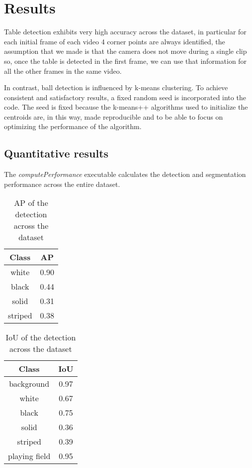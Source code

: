 \section{Results}
Table detection exhibits very high accuracy across the dataset, in particular for each initial frame of each video 4 corner points are always identified, the assumption that we made is that the camera does not move during a single clip so, once the table is detected in the first frame, we can use that information for all the other frames in the same video.

In contrast, ball detection is influenced by k-means clustering. To achieve consistent and satisfactory results, a fixed random seed is incorporated into the code. The seed is fixed because the k-means++ algorithms used to initialize the centroids are, in this way, made reproducible and to be able to focus on optimizing the performance of the algorithm.


\subsection{Quantitative results}
The \textit{computePerformance} executable calculates the detection and segmentation performance across the entire dataset.
\begin{table}[H]
	\centering
	\begin{tabular}{|c|c|}
		\hline
		\textbf{Class} & \textbf{AP} \\
		\hline
		white & 0.90 \\
		\hline
		black & 0.44 \\
		\hline
		solid & 0.31 \\
		\hline
		striped & 0.38 \\
		\hline
	\end{tabular}
	\caption{AP of the detection across the dataset}
	\label{tab: AP across dataset}
\end{table}

\begin{table}[H]
	\centering
	\begin{tabular}{|c|c|}
		\hline
		\textbf{Class} & \textbf{IoU} \\
		\hline
		background & 0.97 \\
		\hline
		white & 0.67 \\
		\hline
		black & 0.75 \\
		\hline
		solid & 0.36 \\
		\hline
		striped & 0.39 \\
		\hline
		playing field & 0.95 \\
		\hline
	\end{tabular}
	\caption{IoU of the detection across the dataset}
	\label{tab: IoU across dataset}
\end{table}

